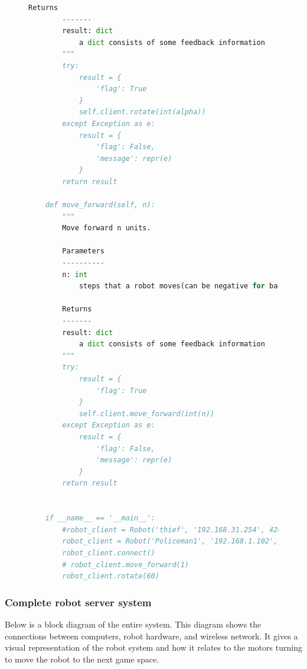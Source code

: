 \documentclass[a4paper,12pt]{article}
\begin{document}
\begin{figure}
\begin{lstlisting}[language=Python]
        Returns
        -------
        result: dict
            a dict consists of some feedback information
        """
        try:
            result = {
                'flag': True
            }
            self.client.rotate(int(alpha))
        except Exception as e:
            result = {
                'flag': False,
                'message': repr(e)
            }
        return result

    def move_forward(self, n):
        """
        Move forward n units.

        Parameters
        ----------
        n: int
            steps that a robot moves(can be negative for backward)

        Returns
        -------
        result: dict
            a dict consists of some feedback information
        """
        try:
            result = {
                'flag': True
            }
            self.client.move_forward(int(n))
        except Exception as e:
            result = {
                'flag': False,
                'message': repr(e)
            }
        return result


	if __name__ == '__main__':
	    #robot_client = Robot('thief', '192.168.31.254', 4242)
	    robot_client = Robot('Policeman1', '192.168.1.102', 4242)
	    robot_client.connect()
	    # robot_client.move_forward(1)
	    robot_client.rotate(60)	
	\end{lstlisting}
	\label{Python Code for Robot Server connection using zerorpc}
	\end{figure}


	\subsubsection{Complete robot server system}
	Below is a block diagram of the entire system. This diagram shows the connections between computers, robot hardware, and wireless network. It gives a visual representation of the robot system and how it relates to the motors turning to move the robot to the next game space.
\end{document}
